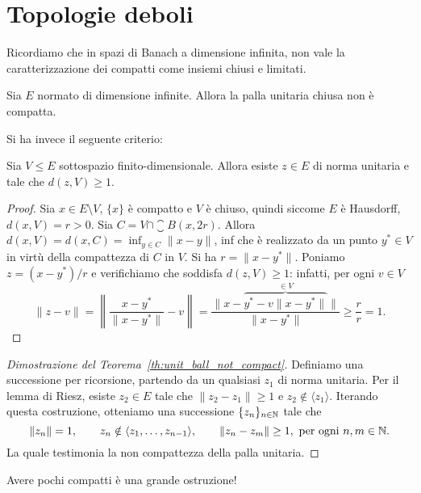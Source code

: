 \chapter{Topologie deboli}
Ricordiamo che in spazi di Banach a dimensione infinita, non vale la caratterizzazione dei compatti come insiemi chiusi e limitati.

\begin{theorem}
\label{th:unit_ball_not_compact}
	Sia $E$ normato di dimensione infinite.
	Allora la palla unitaria chiusa non è compatta.
\end{theorem}

Si ha invece il seguente criterio:

\begin{lemma}[Riesz]
\label{lemma:riesz}
	Sia $V \leq E$ sottospazio finito-dimensionale.
	Allora esiste $z \in E$ di norma unitaria e tale che $d(z, V) \geq 1$.
\end{lemma}
\begin{proof}
	Sia $x \in E \setminus V$, $\{x\}$ è compatto e $V$ è chiuso, quindi siccome $E$ è Hausdorff, $d(x,V) = r>0$.
	Sia $C = V \cap \closure B(x, 2r)$. Allora $d(x, V) = d(x, C) = \inf_{y \in C} \|x-y\|$, inf che è realizzato da un punto $y^* \in V$ in virtù della compattezza di $C$ in $V$. Si ha $r = \|x-y^*\|$. Poniamo $z = (x-y^*)/r$ e verifichiamo che soddisfa $d(z, V) \geq 1$: infatti, per ogni $v \in V$
	\begin{equation*}
		\|z-v\| = \left\| \frac{x-y^*}{\|x-y^*\|} - v \right\| = \frac{\|x-\overbrace{y^* - v\|x-y^*\|}^{\in V}\|}{\|x-y^*\|} \geq \frac{r}r =1.
	\end{equation*}
\end{proof}

\begin{proof}[Dimostrazione del Teorema~\ref{th:unit_ball_not_compact}]
	Definiamo una successione per ricorsione, partendo da un qualsiasi $z_1$ di norma unitaria. Per il lemma di Riesz, esiste $z_2 \in E$ tale che $\|z_2 - z_1\| \geq 1$ e $z_2 \notin \langle z_1 \rangle$. Iterando questa costruzione, otteniamo una successione $\{z_n\}_{n \in \mathbb{N}}$ tale che
	\begin{equation*}
		\|z_n\| =1, \qquad z_n \notin \langle z_1, \ldots, z_{n-1}\rangle, \qquad \|z_n - z_m\| \geq 1,\ \text{per ogni $n, m \in \mathbb{N}$}.
	\end{equation*}
	La quale testimonia la non compattezza della palla unitaria.
\end{proof}

Avere pochi compatti è una grande ostruzione!

